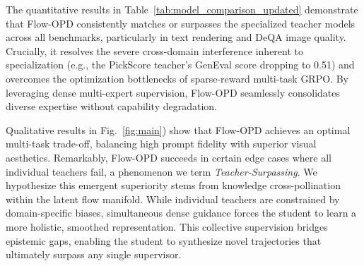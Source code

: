 

The quantitative results in Table~\ref{tab:model_comparison_updated} demonstrate that Flow-OPD consistently matches or surpasses the specialized teacher models across all benchmarks, particularly in text rendering and DeQA image quality. Crucially, it resolves the severe cross-domain interference inherent to specialization (e.g., the PickScore teacher's GenEval score dropping to 0.51) and overcomes the optimization bottlenecks of sparse-reward multi-task GRPO. By leveraging dense multi-expert supervision, Flow-OPD seamlessly consolidates diverse expertise without capability degradation.

Qualitative results in Fig.~\ref{fig:main}) show that Flow-OPD achieves an optimal multi-task trade-off, balancing high prompt fidelity with superior visual aesthetics. Remarkably, Flow-OPD succeeds in certain edge cases where all individual teachers fail, a phenomenon we term \textit{Teacher-Surpassing}. We hypothesize this emergent superiority stems from knowledge cross-pollination within the latent flow manifold. While individual teachers are constrained by domain-specific biases, simultaneous dense guidance forces the student to learn a more holistic, smoothed representation. This collective supervision bridges epistemic gaps, enabling the student to synthesize novel trajectories that ultimately surpass any single supervisor.


